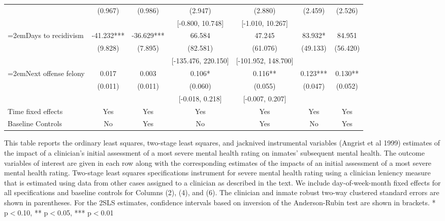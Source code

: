 \begin{table}[htbp]
\begin{center}
\begin{adjustbox}{width=\textwidth, totalheight=\baselineskip,keepaspectratio}
\begin{threeparttable}
\begin{tabular}{p{}*{6}{c}}
                    &     (0.967)   &     (0.986)   &     (2.947)   &     (2.880)   &     (2.459)   &     (2.526)   \\
                    &            &            &[-0.800, 10.748]   &[-1.010, 10.267]   &            &            \\
{\hangindent=2emDays to recidivism}&     -41.232***&     -36.629***&      66.584   &      47.245   &      83.932*  &      84.951   \\
                    &     (9.828)   &     (7.895)   &    (82.581)   &    (61.076)   &    (49.133)   &    (56.420)   \\
                    &            &            &[-135.476, 220.150]   &[-101.952, 148.700]   &            &            \\
{\hangindent=2emNext offense felony}&       0.017   &       0.003   &       0.106*  &       0.116** &       0.123***&       0.130** \\
                    &     (0.011)   &     (0.011)   &     (0.060)   &     (0.055)   &     (0.047)   &     (0.052)   \\
                    &            &            &[-0.018, 0.218]   &[-0.007, 0.207]   &            &            \\
\midrule
Time fixed effects  &         Yes   &         Yes   &         Yes   &         Yes   &         Yes   &         Yes   \\
Baseline Controls   &          No   &         Yes   &          No   &         Yes   &          No   &         Yes   \\
\bottomrule
\end{tabular}
\tiny
This table reports the ordinary least squares, two-stage least squares, and jacknived instrumental variables (Angrist et al 1999) estimates of the impact of a clinician's initial assessment of a most severe mental health rating on inmates' subsequent mental health. The outcome variables of interest are given in each row along with the corresponding estimates of the impacts of an initial assessment of a most severe mental health rating. Two-stage least squares specifications instrument for severe mental health rating using a clinician leniency measure that is estimated using data from other cases assigned to a clinician as described in the text. We include day-of-week-month fixed effects for all specifications and baseline controls for Columns (2), (4), and (6). The clinician and inmate robust two-way clustered standard errors are shown in parentheses. For the 2SLS estimates, confidence intervals based on inversion of the Anderson-Rubin test are shown in brackets. * p$<$0.10, ** p$<$0.05, *** p$<$0.01
\end{threeparttable}
\end{adjustbox}
\end{center}
\end{table}
